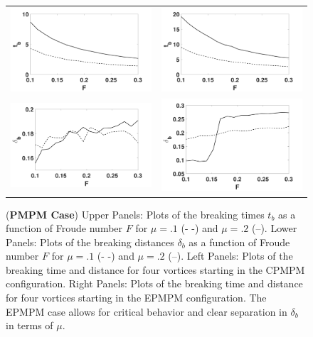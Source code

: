\documentclass[a4paper,11pt]{article}
\begin{document}
\begin{figure}[!h]
\centering
\begin{tabular}{cc}
\includegraphics[width=.5\textwidth]{froude_comp_pmpm} & \includegraphics[width=.5\textwidth]{froude_comp_pmpm_sym}\\
\includegraphics[width=.5\textwidth]{zmb_pmpm} & \includegraphics[width=.5\textwidth]{zmb_pmpm_sym}
\end{tabular}
\caption{\small ({\bf PMPM Case}) Upper Panels: Plots of the breaking times $t_{b}$ as a function of Froude number $F$ for $\mu=.1$ (- -) and $\mu=.2$ (--).  Lower Panels: Plots of the breaking distances $\delta_{b}$ as a function of Froude number $F$ for $\mu=.1$ (- -) and $\mu=.2$ (--). Left Panels: Plots of the breaking time and distance for four vortices starting in the CPMPM configuration.  Right Panels: Plots of the breaking time and distance for four vortices starting in the EPMPM configuration.  The EPMPM case allows for critical behavior and clear separation in $\delta_{b}$ in terms of $\mu$.}
\label{fig:froudecomp_pmpm}
\end{figure}
\end{document}
